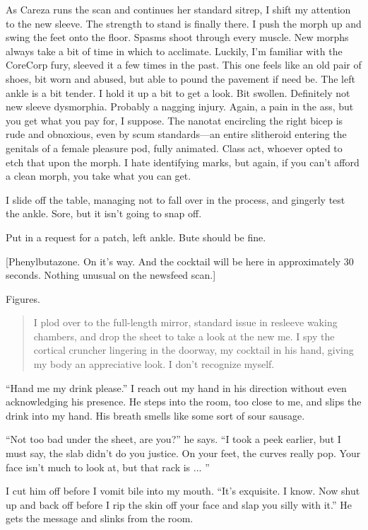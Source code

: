 As Careza runs the scan and continues her standard sitrep, I shift my attention to the new sleeve. The strength to stand is finally there. I push the morph up and swing the feet onto the floor. Spasms shoot through every muscle. New morphs always take a bit of time in which to acclimate. Luckily, I'm familiar with the CoreCorp fury, sleeved it a few times in the past. This one feels like an old pair of shoes, bit worn and abused, but able to pound the pavement if need be. The left ankle is a bit tender. I hold it up a bit to get a look. Bit swollen. Definitely not new sleeve dysmorphia. Probably a nagging injury. Again, a pain in the ass, but you get what you pay for, I suppose. The nanotat encircling the right bicep is rude and obnoxious, even by scum standards—an entire slitheroid entering the genitals of a female pleasure pod, fully animated. Class act, whoever opted to etch that upon the morph. I hate identifying marks, but again, if you can't afford a clean morph, you take what you can get.

I slide off the table, managing not to fall over in the process, and gingerly test the ankle. Sore, but it isn't going to snap off.

Put in a request for a patch, left ankle. Bute should be fine.

[Phenylbutazone. On it's way. And the cocktail will be here in approximately 30 seconds. Nothing unusual on the newsfeed scan.]

Figures.

\begin{quotation}
I plod over to the full-length mirror, standard issue in resleeve waking chambers, and drop the sheet to take a look at the new me. I spy the cortical cruncher lingering in the doorway, my cocktail in his hand, giving my body an appreciative look. I don't recognize myself.
\end{quotation}

``Hand me my drink please.'' I reach out my hand in his direction without even acknowledging his presence. He steps into the room, too close to me, and slips the drink into my hand. His breath smells like some sort of sour sausage.

``Not too bad under the sheet, are you?'' he says. ``I took a peek earlier, but I must say, the slab didn't do you justice. On your feet, the curves really pop. Your face isn't much to look at, but that rack is ... ''

I cut him off before I vomit bile into my mouth. ``It's exquisite. I know. Now shut up and back off before I rip the skin off your face and slap you silly with it.'' He gets the message and slinks from the room.

